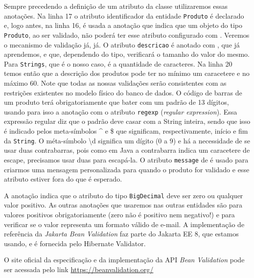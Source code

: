 Sempre precedendo a definição de um atributo da classe utilizaremos essas anotações. Na linha 17 o atributo identificador da entidade \texttt{Produto} é declarado e, logo antes, na linha 16, é usada a anotação  que indica que um objeto do tipo \texttt{Produto}, ao ser validado, não poderá ter esse atributo configurado com . Veremos o mecanismo de validação já, já. O atributo \texttt{descricao} é anotado com , que já aprendemos, e  que, dependendo do tipo, verificará o tamanho do valor do mesmo. Para \texttt{Strings}, que é o nosso caso, é a quantidade de caracteres. Na linha 20 temos então que a descrição dos produtos pode ter no mínimo um caracetere e no máximo 60. Note que todas as nossas validações serão consistentes com as restrições existentes no modelo físico do banco de dados. O código de barras de um produto terá obrigatoriamente que bater com um padrão de 13 dígitos, usando para isso a anotação  com o atributo \texttt{regexp} (\textit{regular expression}). Essa expressão regular diz que o padrão deve casar com a String inteira, sendo que isso é indicado pelos meta-símbolos \^{} e \$ que significam, respectivamente, início e fim da \texttt{String}. O méta-símbolo \textbackslash{}d significa um dígito ($0$ a $9$) e há a necessidade de se usar duas contrabarras, pois como em Java a contrabarra indica um caracetere de escape, precisamos usar duas para escapá-la. O atributo \texttt{message} de  é usado para criarmos uma mensagem personalizada para quando o produto for validado e esse atributo estiver fora do que é esperado.

A anotação  indica que o atributo do tipo \texttt{BigDecimal} deve ser zero ou qualquer valor positivo. As outras anotações que usaremos nas outras entidades são  para valores positivos obrigatoriamente (zero não é positivo nem negativo!) e  para verificar se o valor representa um formato válido de e-mail. A implementação de referência da \textit{Jakarta Bean Validation} faz parte do Jakarta EE 8, que estamos usando, e é fornecida pelo Hibernate Validator.

\begin{saibaMais}
    O site oficial da especificação e da implementação da API \textit{Bean Validation} pode ser acessada pelo link \url{https://beanvalidation.org/}
\end{saibaMais}

